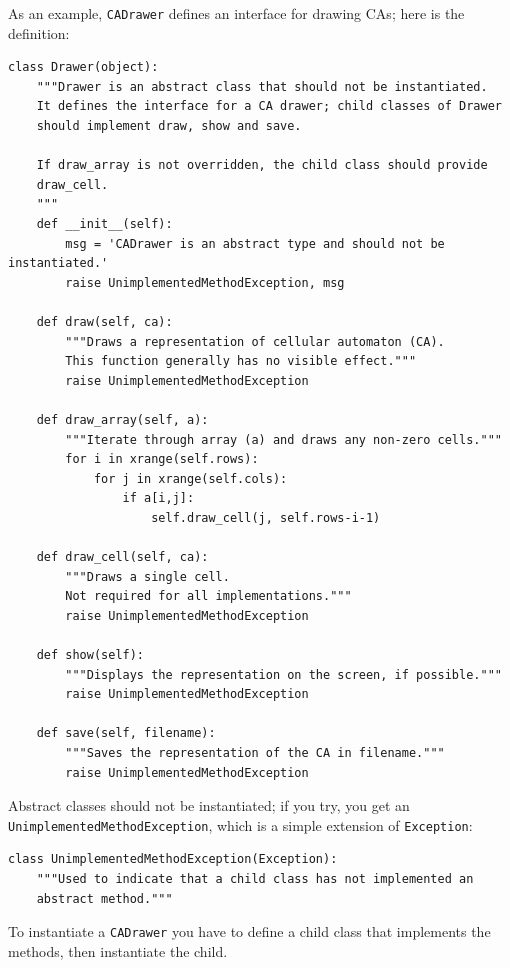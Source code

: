 \documentclass[10pt]{book}
\begin{document}
As an example, {\tt CADrawer}
defines an interface for drawing CAs; here is the definition:

\begin{verbatim}
class Drawer(object):
    """Drawer is an abstract class that should not be instantiated.
    It defines the interface for a CA drawer; child classes of Drawer
    should implement draw, show and save.

    If draw_array is not overridden, the child class should provide
    draw_cell.
    """
    def __init__(self):
        msg = 'CADrawer is an abstract type and should not be instantiated.'
        raise UnimplementedMethodException, msg

    def draw(self, ca):
        """Draws a representation of cellular automaton (CA).
        This function generally has no visible effect."""
        raise UnimplementedMethodException

    def draw_array(self, a):
        """Iterate through array (a) and draws any non-zero cells."""
        for i in xrange(self.rows):
            for j in xrange(self.cols):
                if a[i,j]:
                    self.draw_cell(j, self.rows-i-1)

    def draw_cell(self, ca):
        """Draws a single cell.
        Not required for all implementations."""
        raise UnimplementedMethodException

    def show(self):
        """Displays the representation on the screen, if possible."""
        raise UnimplementedMethodException

    def save(self, filename):
        """Saves the representation of the CA in filename."""
        raise UnimplementedMethodException
\end{verbatim}

Abstract classes should not be instantiated; if you try, you
get an {\tt UnimplementedMethodException}, which is a simple
extension of {\tt Exception}:

\begin{verbatim}
class UnimplementedMethodException(Exception):
    """Used to indicate that a child class has not implemented an
    abstract method."""
\end{verbatim}

To instantiate a {\tt CADrawer} you have to define a child class
that implements the methods, then instantiate the child.
\end{document}
